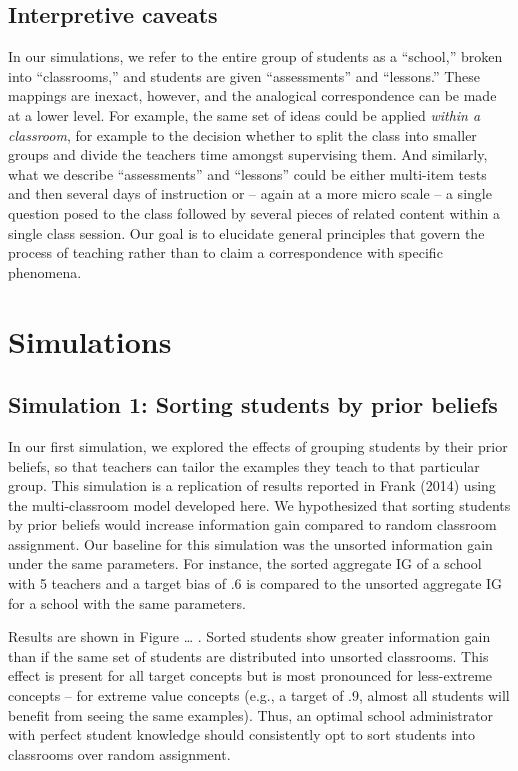 \documentclass[10pt, letterpaper]{article}
\begin{document}
\subsection{Interpretive caveats}\label{interpretive-caveats}

In our simulations, we refer to the entire group of students as a
``school,'' broken into ``classrooms,'' and students are given
``assessments'' and ``lessons.'' These mappings are inexact, however,
and the analogical correspondence can be made at a lower level. For
example, the same set of ideas could be applied \emph{within a
classroom}, for example to the decision whether to split the class into
smaller groups and divide the teachers time amongst supervising them.
And similarly, what we describe ``assessments'' and ``lessons'' could be
either multi-item tests and then several days of instruction or -- again
at a more micro scale -- a single question posed to the class followed
by several pieces of related content within a single class session. Our
goal is to elucidate general principles that govern the process of
teaching rather than to claim a correspondence with specific phenomena.

\section{Simulations}\label{simulations}

\subsection{Simulation 1: Sorting students by prior
beliefs}\label{simulation-1-sorting-students-by-prior-beliefs}

In our first simulation, we explored the effects of grouping students by
their prior beliefs, so that teachers can tailor the examples they teach
to that particular group. This simulation is a replication of results
reported in Frank (2014) using the multi-classroom model developed here.
We hypothesized that sorting students by prior beliefs would increase
information gain compared to random classroom assignment. Our baseline
for this simulation was the unsorted information gain under the same
parameters. For instance, the sorted aggregate IG of a school with 5
teachers and a target bias of .6 is compared to the unsorted aggregate
IG for a school with the same parameters.

Results are shown in Figure \ldots{} . Sorted students show greater
information gain than if the same set of students are distributed into
unsorted classrooms. This effect is present for all target concepts but
is most pronounced for less-extreme concepts -- for extreme value
concepts (e.g., a target of .9, almost all students will benefit from
seeing the same examples). Thus, an optimal school administrator with
perfect student knowledge should consistently opt to sort students into
classrooms over random assignment.
\end{document}
